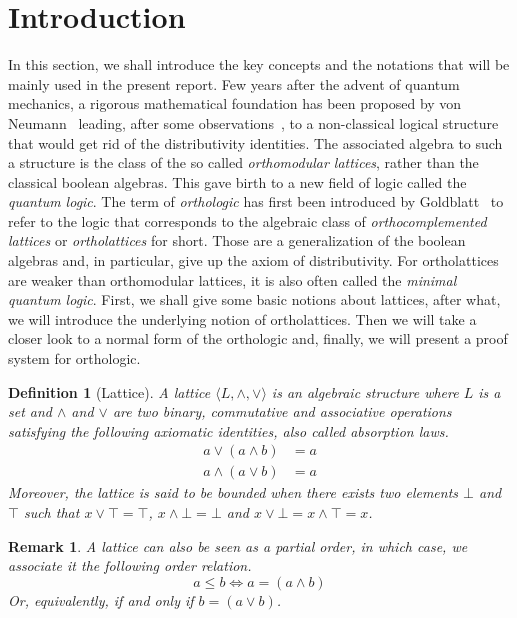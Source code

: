 \documentclass[a4paper, 11pt]{article}
\newtheorem{definition}[theorem]{Definition}
\newtheorem*{remark}{Remark}
\begin{document}
    \section{Introduction}
    In this section, we shall introduce the key concepts and the notations that will be mainly used in
    the present report. Few years after the advent of quantum mechanics, a rigorous mathematical 
    foundation has been proposed by von Neumann~\cite{30573279-e8ec-3f1e-b0ba-eaf73275f821} leading, 
    after some observations~\cite{2c73be7a-3de4-3824-8e11-49ebe4b183e4}, to a 
    non-classical logical structure that would get rid of the distributivity identities. 
    The associated algebra to such a structure is the class of the so
    called \textit{orthomodular lattices}, rather than the classical boolean algebras. This gave birth 
    to a new
    field of logic called the \textit{quantum logic}. The term of \textit{orthologic} has first been 
    introduced
    by Goldblatt~\cite{865e9aad-6de2-3b16-9861-412a9b18e683} to refer to the logic that corresponds to
    the algebraic class of \textit{orthocomplemented lattices} or \textit{ortholattices} for short.
    Those are a generalization of the boolean algebras and, in particular, give up the axiom of 
    distributivity. For ortholattices are weaker than orthomodular lattices, it is also
    often called the \textit{minimal quantum logic}. 
    First, we shall give some basic notions about lattices, after what, we will introduce the underlying 
    notion of ortholattices. Then we will take a closer look to
    a normal form of the orthologic and, finally, we will present a proof system for orthologic.
    \begin{definition}[Lattice]
	    A lattice $\langle L,\wedge,\vee\rangle$ is an algebraic structure where $L$ is a set and 
	    $\wedge$ and $\vee$ are two binary, commutative and associative operations satisfying the
	    following axiomatic identities, also called \textit{absorption laws}.
	    \begin{align*}
		    a\vee(a\wedge b)&=a\\
		    a\wedge(a\vee b)&=a
	    \end{align*}
	    Moreover, the lattice is said to be bounded when there exists two elements $\bot$ and $\top$
	    such that $x\vee\top=\top$, $x\wedge\bot=\bot$ and $x\vee\bot=x\wedge\top=x$.
    \end{definition}
    \begin{remark}
    A lattice can also be seen as a partial order, in which case, we associate it the following order
    relation.
    \[
	a\leq b\Leftrightarrow a=(a\wedge b)
    \]
    Or, equivalently, if and only if $b=(a\vee b)$.	
    \end{remark}
\end{document}
